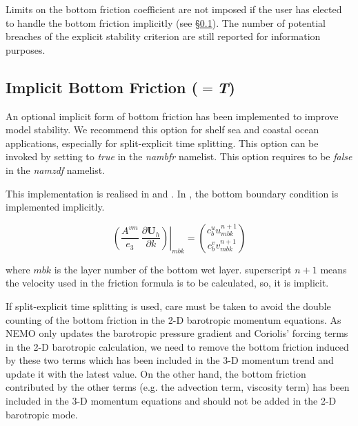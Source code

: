Limits on the bottom friction coefficient are not imposed if the user has elected to
handle the bottom friction implicitly (see \S\ref{ZDF_bfr_imp}). The number of potential
breaches of the explicit stability criterion are still reported for information purposes.

\subsection{Implicit Bottom Friction ($=$\textit{T})}
\label{ZDF_bfr_imp}

An optional implicit form of bottom friction has been implemented to improve
model stability. We recommend this option for shelf sea and coastal ocean applications, especially 
for split-explicit time splitting. This option can be invoked by setting  
to \textit{true} in the \textit{nambfr} namelist. This option requires  to be \textit{false} 
in the \textit{namzdf} namelist. 

This implementation is realised in  and . In , the 
bottom boundary condition is implemented implicitly.

\begin{equation} \label{Eq_dynzdf_bfr}
\left.{\left( {\frac{A^{vm} }{e_3 }\ \frac{\partial \textbf{U}_h}{\partial k}} \right)} \right|_{mbk}
	 = \binom{c_{b}^{u}u^{n+1}_{mbk}}{c_{b}^{v}v^{n+1}_{mbk}}
\end{equation}

where $mbk$ is the layer number of the bottom wet layer. superscript $n+1$ means the velocity used in the
friction formula is to be calculated, so, it is implicit.

If split-explicit time splitting is used, care must be taken to avoid the double counting of
the bottom friction in the 2-D barotropic momentum equations. As NEMO only updates the barotropic 
pressure gradient and Coriolis' forcing terms in the 2-D barotropic calculation, we need to remove
the bottom friction induced by these two terms which has been included in the 3-D momentum trend 
and update it with the latest value. On the other hand, the bottom friction contributed by the
other terms (e.g. the advection term, viscosity term) has been included in the 3-D momentum equations
and should not be added in the 2-D barotropic mode.

